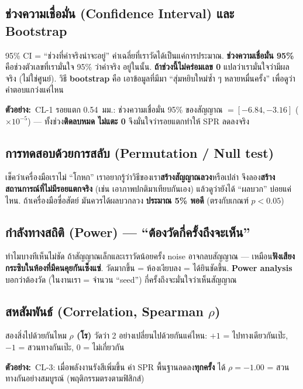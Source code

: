 \documentclass[17pt]{extarticle}
\newcommand{\ex}{\textcolor{ok}{\textbf{ตัวอย่าง:}}\ }
\begin{document}
\subsection{ช่วงความเชื่อมั่น (Confidence Interval) และ Bootstrap}
\begin{concept}{95\% CI = ``ช่วงที่ค่าจริงน่าจะอยู่''}
ค่าเฉลี่ยที่เราวัดได้เป็นแค่การประมาณ. \textbf{ช่วงความเชื่อมั่น 95\%} คือช่วงตัวเลขที่เรามั่นใจ 95\% ว่าค่าจริง
อยู่ในนั้น. \textbf{ถ้าช่วงนี้ไม่คร่อมเลข 0} แปลว่าเรามั่นใจว่ามีผลจริง (ไม่ใช่ศูนย์). วิธี \textbf{bootstrap} คือ
เอาข้อมูลที่มีมา ``สุ่มหยิบใหม่ซ้ำ ๆ หลายหมื่นครั้ง'' เพื่อดูว่าคำตอบแกว่งแค่ไหน
\end{concept}
\begin{example}
\ex CL-1 รอยแตก 0.54~มม.: ช่วงความเชื่อมั่น 95\% ของสัญญาณ $=[-6.84,-3.16]$ ($\times10^{-5}$) ---
ทั้งช่วง\textbf{ติดลบหมด ไม่แตะ 0} จึงมั่นใจว่ารอยแตกทำให้ SPR ลดลงจริง
\end{example}

\subsection{การทดสอบด้วยการสลับ (Permutation / Null test)}
\begin{concept}{เช็คว่าเครื่องมือเราไม่ ``โกหก''}
เราอยากรู้ว่าวิธีของเรา\textbf{สร้างสัญญาณลวง}หรือเปล่า จึงลอง\textbf{สร้างสถานการณ์ที่ไม่มีรอยแตกจริง} (เช่น
เอาภาพปกติมาเทียบกันเอง) แล้วดูว่ายังได้ ``ผลบวก'' บ่อยแค่ไหน. ถ้าเครื่องมือซื่อสัตย์ มันควรได้ผลบวกลวง
\textbf{ประมาณ 5\% พอดี} (ตรงกับเกณฑ์ $p<0.05$)
\end{concept}

\subsection{กำลังทางสถิติ (Power) --- ``ต้องวัดกี่ครั้งถึงจะเห็น''}
\begin{concept}{ทำไมบางทีเห็นไม่ชัด}
ถ้าสัญญาณเล็กและเราวัดน้อยครั้ง noise อาจกลบสัญญาณ --- เหมือน\textbf{ฟังเสียงกระซิบในห้องที่มีคนคุยกันเซ็งแซ่}.
วัดมากขึ้น = ห้องเงียบลง = ได้ยินชัดขึ้น. \textbf{Power analysis} บอกว่าต้องวัด (ในงานเรา = จำนวน ``seed'')
กี่ครั้งถึงจะมั่นใจว่าเห็นสัญญาณ
\end{concept}

\subsection{สหสัมพันธ์ (Correlation, Spearman $\rho$)}
\begin{concept}{สองสิ่งไปด้วยกันไหม}
\textbf{$\rho$ (โร)} วัดว่า 2 อย่างเปลี่ยนไปด้วยกันแค่ไหน: $+1$ = ไปทางเดียวกันเป๊ะ, $-1$ = สวนทางกันเป๊ะ,
$0$ = ไม่เกี่ยวกัน
\end{concept}
\begin{example}
\ex CL-3: เมื่อพลังงานรังสีเพิ่มขึ้น ค่า SPR พื้นฐานลดลง\textbf{ทุกครั้ง} ได้ $\rho=-1.00$ = สวนทางกันอย่างสมบูรณ์
(พฤติกรรมตรงตามฟิสิกส์)
\end{example}
\end{document}
